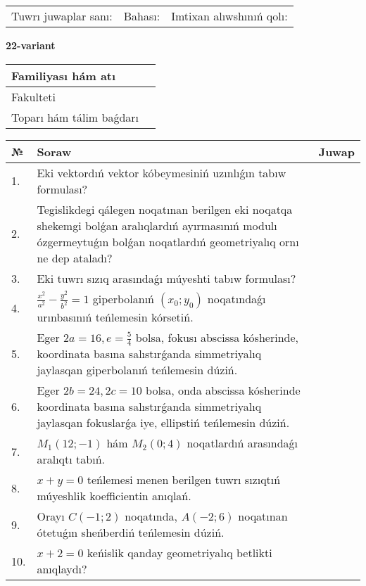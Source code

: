 \documentclass{article}
\begin{document}
\vspace{1cm}

\begin{tabular}{lll}
Tuwrı juwaplar sanı: \underline{\hspace{1.5cm}} & 
Bahası: \underline{\hspace{1.5cm}} & 
Imtixan alıwshınıń qolı: \underline{\hspace{2cm}} \\
\end{tabular}

\egroup

\newpage


\textbf{22-variant}\\

\bgroup
\def\arraystretch{1.6} %

\begin{tabular}{|m{5.7cm}|m{9.5cm}|}
\hline
Familiyası hám atı & \\
\hline
Fakulteti  & \\
\hline
Toparı hám tálim baǵdarı  & \\
\hline
\end{tabular}

\vspace{1cm}

\begin{tabular}{|m{0.7cm}|m{10cm}|m{4cm}|}
\hline
№ & Soraw & Juwap \\
\hline
1. & Eki vektordıń vektor kóbeymesiniń uzınlıǵın tabıw formulası? &  \\
\hline
2. & Tegislikdegi qálegen noqatınan berilgen eki noqatqa shekemgi bolǵan aralıqlardıń ayırmasınıń modulı ózgermeytuǵın bolǵan noqatlardıń geometriyalıq ornı ne dep ataladı? &  \\
\hline
3. & Eki tuwrı sızıq arasındaǵı múyeshti tabıw formulası? &  \\
\hline
4. & $\frac{x^2}{a^2}-\frac{y^2}{b^2}=1$ giperbolanıń $(x_0;y_0)$ noqatındaǵı urınbasınıń teńlemesin kórsetiń. &  \\
\hline
5. & Eger $2a=16, e=\frac{5}{4}$ bolsa, fokusı abscissa kósherinde, koordinata basına salıstırǵanda simmetriyalıq jaylasqan giperbolanıń teńlemesin dúziń. &  \\
\hline
6. & Eger $2b=24, 2 c=10$ bolsa, onda abscissa kósherinde koordinata basına salıstırǵanda simmetriyalıq jaylasqan fokuslarǵa iye, ellipstiń teńlemesin dúziń. &  \\
\hline
7. & $M_{1} (12;-1)$ hám $M_{2} (0;4)$ noqatlardıń arasındaǵı aralıqtı tabıń. &  \\
\hline
8. & $x+y=0$ teńlemesi menen berilgen tuwrı sızıqtıń múyeshlik koefficientin anıqlań. &  \\
\hline
9. & Orayı $C (-1;2)$ noqatında, $A (-2;6 )$ noqatınan ótetuǵın sheńberdiń teńlemesin dúziń. &  \\
\hline
10. & $x+2=0$ keńislik qanday geometriyalıq betlikti anıqlaydı? &  \\
\hline
\end{tabular}
\end{document}
